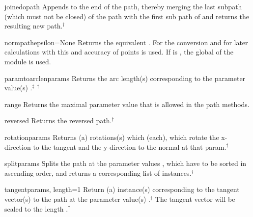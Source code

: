 \begin{methoddesc}{joined}{opath}
  Appends  to the end of the path, thereby merging the last
  subpath (which must not be closed) of the path with the first sub
  path of  and returns the resulting new path.$^\dagger$
\end{methoddesc}

\begin{methoddesc}{normpath}{epsilon=None}
  Returns the equivalent . For the conversion and for later
  calculations with this  and accuracy of
   points is used. If  is , the
  global  of the  module is used. 
\end{methoddesc}

\begin{methoddesc}{paramtoarclen}{params}
  Returns the arc length(s) corresponding to the parameter value(s)
  .$^\ddagger$ $^\dagger$
\end{methoddesc}


\begin{methoddesc}{range}{}
  Returns the maximal parameter value  that is allowed in the
  path methods. 
\end{methoddesc}

\begin{methoddesc}{reversed}{}
  Returns the reversed path.$^\dagger$
\end{methoddesc}

\begin{methoddesc}{rotation}{params}
  Returns (a) rotations(s) which (each), which rotate the x-direction
  to the tangent and the y-direction to the normal at that param.$^\dagger$
\end{methoddesc}

\begin{methoddesc}{split}{params}
  Splits the path at the parameter values , which have to
  be sorted in ascending order, and returns a corresponding list of
   instances.$^\dagger$
\end{methoddesc}

\begin{methoddesc}{tangent}{params, length=1}
  Return (a)  instance(s) corresponding to the tangent
  vector(s) to the path at the parameter value(s)
  .$^\ddagger$ The tangent vector will be scaled to the length
  .$^\dagger$
\end{methoddesc}

